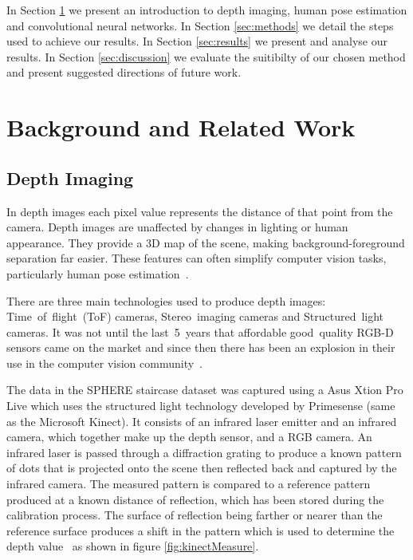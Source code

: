 \documentclass[11pt]{article} %
\begin{document}
In Section \ref{sec:bg} we present an introduction to depth imaging, human pose estimation and convolutional neural networks. In Section \ref{sec:methods} we detail the steps used to achieve our results. In Section \ref{sec:results} we present and analyse our results. In Section \ref{sec:discussion} we evaluate the suitibilty of our chosen method and present suggested directions of future work.






\section{Background and Related Work}
\label{sec:bg}
\subsection{Depth Imaging}
\label{sec:Depth}


In depth images each pixel value represents the distance of that point from the camera. Depth images are unaffected by changes in lighting or human appearance. They provide a 3D map of the scene, making background-foreground separation far easier. These features can often simplify computer vision tasks, particularly human pose estimation~\cite{Chen2013}.

There are three main technologies used to produce depth images: Time~of~flight~(ToF) cameras, Stereo~imaging cameras and Structured~light cameras. It was not until the last~5~years that affordable good~quality RGB-D sensors came on the market and since then there has been an explosion in their use in the computer vision community~\cite{Han2013}.

The data in the SPHERE staircase dataset was captured using a Asus Xtion Pro Live which uses the structured light technology developed by Primesense (same as the Microsoft Kinect). It consists of an infrared laser emitter and an infrared camera, which together make up the depth sensor, and a RGB camera. An infrared laser is passed through a diffraction grating to produce a known pattern of dots that is projected onto the scene then reflected back and captured by the infrared camera. The measured pattern is compared to a reference pattern produced at a known distance of reflection, which has been stored during the calibration process. The surface of reflection being farther or nearer than the reference surface produces a shift in the pattern which is used to determine the depth value~\cite{Zhang2012a,Khoshelham2012a} as shown in figure \ref{fig:kinectMeasure}.
\end{document}
